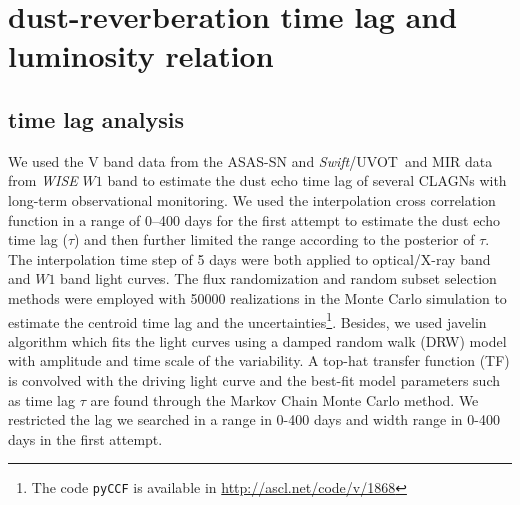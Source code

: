 \documentclass[linenumbers]{aastex631}
\newcommand{\uvot}{{\small {\it Swift}/UVOT}}
\begin{document}
\section{dust-reverberation time lag and luminosity relation}
\subsection{time lag analysis}
We used the V band data from the ASAS-SN \citep[All-sky Automated Survey for Supernovae,][]{2014ApJ...788...48S,2017PASP..129j4502K,2019MNRAS.485..961J} and \uvot\, and MIR data from {\it WISE} $W1$ band to estimate the dust echo time lag of several CLAGNs with long-term observational monitoring. We used the interpolation cross correlation function \citep[ICCF;][]{1998PASP..110..660P,2018ascl.soft05032S} in a range of 0--400 days for the first attempt to estimate the dust echo time lag ($\tau$) and then further limited the range according to the posterior of $\tau$. The interpolation time step of 5 days were both applied to optical/X-ray band and $W1$ band light curves. The flux randomization and random subset selection methods were employed with 50000 realizations in the Monte Carlo simulation to estimate the centroid time lag and the uncertainties\footnote{The code \texttt{pyCCF} is available in \url{http://ascl.net/code/v/1868}}. Besides, we used {\sc javelin} algorithm which fits the light curves using a damped random walk (DRW) model with amplitude and time scale of the variability. A top-hat transfer function (TF) is convolved with the driving light curve and the best-fit model parameters such as time lag $\tau$ are found through the Markov Chain Monte Carlo method. We restricted the lag we searched in a range in 0-400 days and width range in 0-400 days in the first attempt. 
\end{document}
